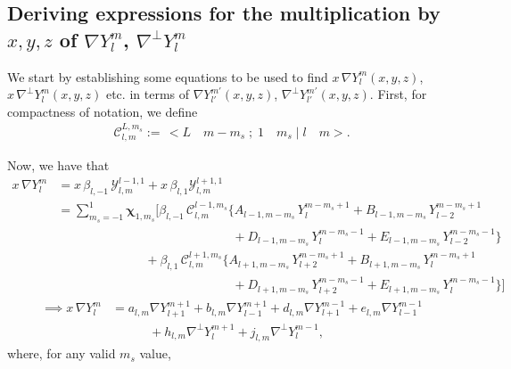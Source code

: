 \documentclass[11pt, oneside]{article}   	%
\newcommand{\Ylm}{Y^m_l}
\newcommand{\gradY}{\nabla Y}
\newcommand{\gradYlm}{\nabla Y^m_l}
\newcommand{\gradpY}{\nabla^\perp Y}
\newcommand{\gradpYlm}{\nabla^\perp Y^m_l}
\newcommand{\curlyy}{\bm{\mathcal{Y}}}
\newcommand{\blone}{\beta_{l, 1}}
\newcommand{\blmone}{\beta_{l, -1}}
\newcommand{\chivec}{\bm{\chi}_{1,m_s}}
\newcommand{\cgcoeff}{\mathcal{C}}
\newcommand{\alm}{a_{l,m}}
\newcommand{\blm}{b_{l,m}}
\newcommand{\dlm}{d_{l,m}}
\newcommand{\elm}{e_{l,m}}
\newcommand{\hlm}{h_{l,m}}
\newcommand{\jlm}{j_{l,m}}
\begin{document}
\subsection{Deriving expressions for the multiplication by \(x, y, z\) of \(\nabla \Ylm\), \(\nabla^\perp \Ylm\) }

We start by establishing some equations to be used to find \(x \,\gradYlm (x,y,z)\), \(x \,\gradpYlm (x,y,z)\) etc. in terms of \(\gradY^{m'}_{l'} (x,y,z)\), \(\gradpY^{m'}_{l'} (x,y,z)\). First, for compactness of notation, we define
\begin{align}
\cgcoeff^{L, m_s}_{l, m} := \, < L \quad m-m_s \; ; \; 1 \quad m_s \; | \; l \quad m >.
\end{align}

Now, we have that
\begin{align}
x \,\gradYlm 
&= x \, \blmone \, \curlyy^{l-1,1}_{l,m} + x \, \blone \curlyy^{l+1,1}_{l,m} \nonumber
\\
&= \sum_{m_s=-1}^{1} \chivec \Big[ \blmone \, \cgcoeff^{l-1,m_s}_{l,m} \big\{ A_{l-1,m-m_s} \, Y^{m-m_s+1}_{l} + B_{l-1,m-m_s} \, Y^{m-m_s+1}_{l-2} \nonumber \\ 
& \quad \quad \quad \quad \quad \quad \quad \quad \quad \quad \quad \quad \quad \quad + D_{l-1,m-m_s} \, Y^{m-m_s-1}_{l} + E_{l-1,m-m_s} \, Y^{m-m_s-1}_{l-2} \big\} \nonumber \\
& \quad \quad \quad \quad \quad \quad \quad + \blone \, \cgcoeff^{l+1,m_s}_{l,m} \big\{ A_{l+1,m-m_s} \, Y^{m-m_s+1}_{l+2} + B_{l+1,m-m_s} \, Y^{m-m_s+1}_{l} \nonumber \\ 
& \quad \quad \quad \quad \quad \quad \quad \quad \quad \quad \quad \quad \quad \quad + D_{l+1,m-m_s} \, Y^{m-m_s-1}_{l+2} + E_{l+1,m-m_s} \, Y^{m-m_s-1}_{l} \big\} \Big]
\end{align}
\begin{align}
\implies x \,\gradYlm &= \alm \gradY^{m+1}_{l+1} + \blm \gradY^{m+1}_{l-1} + \dlm \gradY^{m-1}_{l+1} + \elm \gradY^{m-1}_{l-1} \nonumber \\
& \quad \quad \quad + \hlm \gradpY^{m+1}_{l} + \jlm \gradpY^{m-1}_{l},
\end{align}
where, for any valid \(m_s\) value,
\end{document}
